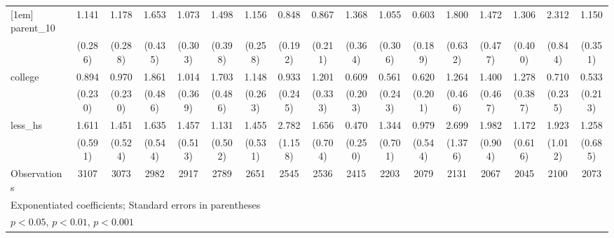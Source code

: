 {\begin{tabular}{l*{16}{c}}
[1em]
parent\_10           &       1.141         &       1.178         &       1.653         &       1.073         &       1.498         &       1.156         &       0.848         &       0.867         &       1.368         &       1.055         &       0.603         &       1.800         &       1.472         &       1.306         &       2.312\sym{*}  &       1.150         \\
                    &     (0.286)         &     (0.288)         &     (0.435)         &     (0.303)         &     (0.398)         &     (0.258)         &     (0.192)         &     (0.211)         &     (0.364)         &     (0.306)         &     (0.189)         &     (0.632)         &     (0.477)         &     (0.400)         &     (0.844)         &     (0.351)         \\
[1em]
college             &       0.894         &       0.970         &       1.861\sym{*}  &       1.014         &       1.703         &       1.148         &       0.933         &       1.201         &       0.609         &       0.561         &       0.620         &       1.264         &       1.400         &       1.278         &       0.710         &       0.533         \\
                    &     (0.230)         &     (0.230)         &     (0.486)         &     (0.369)         &     (0.486)         &     (0.263)         &     (0.245)         &     (0.333)         &     (0.203)         &     (0.243)         &     (0.201)         &     (0.466)         &     (0.467)         &     (0.387)         &     (0.235)         &     (0.213)         \\
[1em]
less\_hs             &       1.611         &       1.451         &       1.635         &       1.457         &       1.131         &       1.455         &       2.782\sym{*}  &       1.656         &       0.470         &       1.344         &       0.979         &       2.699         &       1.982         &       1.172         &       1.923         &       1.258         \\
                    &     (0.591)         &     (0.524)         &     (0.544)         &     (0.513)         &     (0.502)         &     (0.531)         &     (1.158)         &     (0.704)         &     (0.250)         &     (0.701)         &     (0.544)         &     (1.376)         &     (0.904)         &     (0.616)         &     (1.012)         &     (0.685)         \\
\hline
Observations        &        3107         &        3073         &        2982         &        2917         &        2789         &        2651         &        2545         &        2536         &        2415         &        2203         &        2079         &        2131         &        2067         &        2045         &        2100         &        2073         \\
\hline\hline
\multicolumn{17}{l}{\footnotesize Exponentiated coefficients; Standard errors in parentheses}\\
\multicolumn{17}{l}{\footnotesize \sym{*} \(p<0.05\), \sym{**} \(p<0.01\), \sym{***} \(p<0.001\)}\\
\end{tabular}
}
